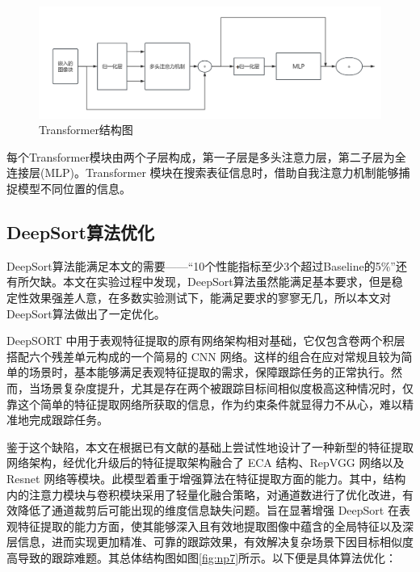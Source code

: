 \begin{figure}[htbp] %
	\centering
	\includegraphics[width=1\textwidth]{np6} %
	\caption{Transformer结构图} %
	\label{fig:np6} %
\end{figure}


每个Transformer模块由两个子层构成，第一子层是多头注意力层，第二子层为全连接层(MLP)。Transformer 模块在搜索表征信息时，借助自我注意力机制能够捕捉模型不同位置的信息。



\subsection{DeepSort算法优化}
DeepSort算法能满足本文的需要——“10个性能指标至少3个超过Baseline的5\%”还有所欠缺。本文在实验过程中发现，DeepSort算法虽然能满足基本要求，但是稳定性效果强差人意，在多数实验测试下，能满足要求的寥寥无几，所以本文对DeepSort算法做出了一定优化。


DeepSORT 中用于表观特征提取的原有网络架构相对基础，它仅包含卷两个积层搭配六个残差单元构成的一个简易的 CNN 网络\cite{HLKX202504027}。这样的组合在应对常规且较为简单的场景时，基本能够满足表观特征提取的需求，保障跟踪任务的正常执行。然而，当场景复杂度提升，尤其是存在两个被跟踪目标间相似度极高这种情况时，仅靠这个简单的特征提取网络所获取的信息，作为约束条件就显得力不从心，难以精准地完成跟踪任务。

鉴于这个缺陷，本文在根据已有文献的基础上\cite{DZDK202405010}尝试性地设计了一种新型的特征提取网络架构，经优化升级后的特征提取架构融合了 ECA 结构、RepVGG 网络以及Resnet 网络等模块。此模型着重于增强算法在特征提取方面的能力。其中，结构内的注意力模块与卷积模块采用了轻量化融合策略，对通道数进行了优化改进，有效降低了通道裁剪后可能出现的维度信息缺失问题。旨在显著增强 DeepSort 在表观特征提取的能力方面，使其能够深入且有效地提取图像中蕴含的全局特征以及深层信息，进而实现更加精准、可靠的跟踪效果，有效解决复杂场景下因目标相似度高导致的跟踪难题。其总体结构图如图\ref{fig:np7}所示。以下便是具体算法优化：

